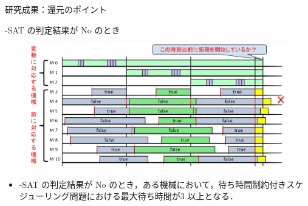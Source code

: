 \documentclass[dvipdfmx]{beamer}
\begin{document}
    \begin{frame}{研究成果：還元のポイント}
      \begin{block}{{-SAT} の判定結果が No のとき}
        \begin{figure}[h]
          \centering
          \includegraphics[width=12cm]{figure/reduction2.pdf}
        \end{figure}
      \end{block}
      \begin{itemize}
        \setlength{\leftskip}{-3mm}
        \item {-SAT} の判定結果が \alert{No} のとき，ある機械において，待ち時間制約付きスケジューリング問題における最大待ち時間が\alert{3 以上}となる．
      \end{itemize}
    \end{frame}
\end{document}
